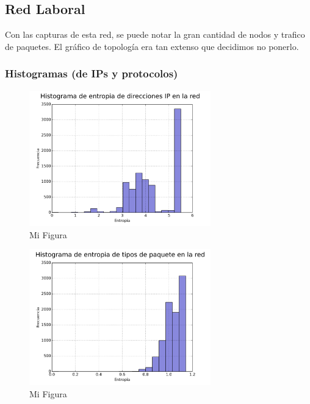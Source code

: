 
\subsection{Red Laboral}

Con las capturas de esta red, se puede notar la gran cantidad de nodos y trafico de paquetes.
El gráfico de topología era tan extenso que decidimos no ponerlo.

\FloatBarrier

\subsubsection{Histogramas (de IPs y protocolos)}

\begin{figure}[h!]
  \centering
   \includegraphics[width=0.7\textwidth]{graficos/red_baufest_hist_arp.png}
  \caption{Mi Figura}
  \label{fig:red_baufest_hist_arp}
\end{figure}

\begin{figure}[h!]
  \centering
   \includegraphics[width=0.7\textwidth]{graficos/red_baufest_hist_type.png}
  \caption{Mi Figura}
  \label{fig:red_baufest_hist_type}
\end{figure}

